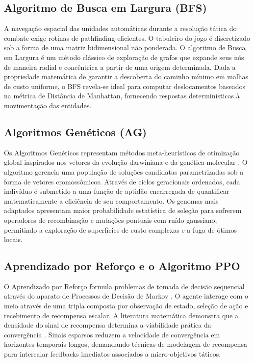 \documentclass[12pt]{article}
\begin{document}
\subsection{Algoritmo de Busca em Largura (BFS)}
A navegação espacial das unidades automáticas durante a resolução tática do combate exige rotinas de pathfinding eficientes. O tabuleiro do jogo é discretizado sob a forma de uma matriz bidimensional não ponderada. O algoritmo de Busca em Largura é um método clássico de exploração de grafos que expande seus nós de maneira radial e concêntrica a partir de uma origem determinada. Dada a propriedade matemática de garantir a descoberta do caminho mínimo em malhas de custo uniforme, o BFS revela-se ideal para computar deslocamentos baseados na métrica de Distância de Manhattan, fornecendo respostas determinísticas à movimentação das entidades.

\subsection{Algoritmos Genéticos (AG)}
Os Algoritmos Genéticos representam métodos meta-heurísticos de otimização global inspirados nos vetores da evolução darwiniana e da genética molecular \cite{goldberg1989, holland1975}. O algoritmo gerencia uma população de soluções candidatas parametrizadas sob a forma de vetores cromossômicos. Através de ciclos geracionais ordenados, cada indivíduo é submetido a uma função de aptidão encarregada de quantificar matematicamente a eficiência de seu comportamento. Os genomas mais adaptados apresentam maior probabilidade estatística de seleção para sofrerem operadores de recombinação e mutações pontuais com ruído gaussiano, permitindo a exploração de superfícies de custo complexas e a fuga de ótimos locais.

\subsection{Aprendizado por Reforço e o Algoritmo PPO}
O Aprendizado por Reforço formula problemas de tomada de decisão sequencial através do aparato de Processos de Decisão de Markov \cite{sutton2018}. O agente interage com o meio através de uma tripla composta por observação de estado, seleção de ação e recebimento de recompensa escalar. A literatura matemática demonstra que a densidade do sinal de recompensa determina a viabilidade prática da convergência \cite{mnih2015}. Sinais esparsos reduzem a velocidade de convergência em horizontes temporais longos, demandando técnicas de modelagem de recompensa para intercalar feedbacks imediatos associados a micro-objetivos táticos.
\end{document}
